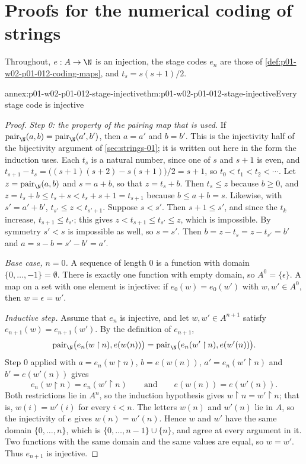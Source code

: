 \section{Proofs for the numerical coding of strings}
\label{sec:annex-p01-w02-p01-012-string-coding}

Throughout, \(e:A\to\N\) is an injection, the stage codes \(e_n\) are those
of \cref{def:p01-w02-p01-012-coding-maps}, and \(t_s=s(s+1)/2\).

\begin{annexitem}{annex:p01-w02-p01-012-stage-injective}{thm:p01-w02-p01-012-stage-injective}{Every stage code is injective}
\begin{proof}
\emph{Step 0: the property of the pairing map that is used.} If
\(\operatorname{pair}_{\N}(a,b)=\operatorname{pair}_{\N}(a',b')\), then
\(a=a'\) and \(b=b'\). This is the injectivity half of the bijectivity
argument of \cref{sec:strings-01}; it is written out here in the form the
induction uses. Each \(t_s\) is a natural number, since one of \(s\) and
\(s+1\) is even, and \(t_{s+1}-t_s=\bigl((s+1)(s+2)-s(s+1)\bigr)/2=s+1\), so
\(t_0<t_1<t_2<\cdots\). Let \(z=\operatorname{pair}_{\N}(a,b)\) and
\(s=a+b\), so that \(z=t_s+b\). Then \(t_s\leq z\) because \(b\geq0\), and
\(z=t_s+b\leq t_s+s<t_s+s+1=t_{s+1}\) because \(b\leq a+b=s\). Likewise,
with \(s'=a'+b'\), \(t_{s'}\leq z<t_{s'+1}\). Suppose \(s<s'\). Then
\(s+1\leq s'\), and since the \(t_k\) increase, \(t_{s+1}\leq t_{s'}\); this
gives \(z<t_{s+1}\leq t_{s'}\leq z\), which is impossible. By symmetry
\(s'<s\) is impossible as well, so \(s=s'\). Then \(b=z-t_s=z-t_{s'}=b'\) and
\(a=s-b=s'-b'=a'\).

\emph{Base case, \(n=0\).} A sequence of length \(0\) is a function with
domain \(\{0,\ldots,-1\}=\emptyset\). There is exactly one function with
empty domain, so \(A^0=\{\epsilon\}\). A map on a set with one element is
injective: if \(e_0(w)=e_0(w')\) with \(w,w'\in A^0\), then
\(w=\epsilon=w'\).

\emph{Inductive step.} Assume that \(e_n\) is injective, and let
\(w,w'\in A^{n+1}\) satisfy \(e_{n+1}(w)=e_{n+1}(w')\). By the definition of
\(e_{n+1}\),
\[
  \operatorname{pair}_{\N}\bigl(e_n(w\mathbin{\upharpoonright}n),e(w(n))\bigr)
  =\operatorname{pair}_{\N}\bigl(e_n(w'\mathbin{\upharpoonright}n),e(w'(n))\bigr).
\]
Step 0 applied with \(a=e_n(w\mathbin{\upharpoonright}n)\),
\(b=e(w(n))\), \(a'=e_n(w'\mathbin{\upharpoonright}n)\) and
\(b'=e(w'(n))\) gives
\[
  e_n(w\mathbin{\upharpoonright}n)=e_n(w'\mathbin{\upharpoonright}n)
  \qquad\text{and}\qquad
  e(w(n))=e(w'(n)).
\]
Both restrictions lie in \(A^n\), so the induction hypothesis gives
\(w\mathbin{\upharpoonright}n=w'\mathbin{\upharpoonright}n\); that is,
\(w(i)=w'(i)\) for every \(i<n\). The letters \(w(n)\) and \(w'(n)\) lie in
\(A\), so the injectivity of \(e\) gives \(w(n)=w'(n)\). Hence \(w\) and
\(w'\) have the same domain \(\{0,\ldots,n\}\), which is
\(\{0,\ldots,n-1\}\cup\{n\}\), and agree at every argument in it. Two
functions with the same domain and the same values are equal, so \(w=w'\).
Thus \(e_{n+1}\) is injective.


\end{proof}
\end{annexitem}

